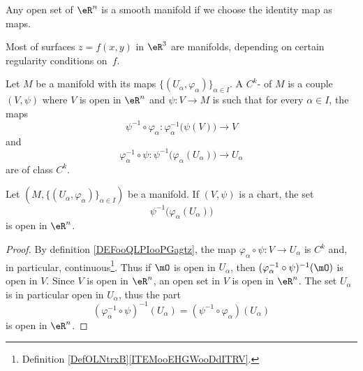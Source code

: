 \begin{example}
    Any open set of $\eR^n$ is a smooth manifold if we choose the identity map as maps.
\end{example} 

Most of surfaces $z=f(x,y)$ in $\eR^3$ are manifolds, depending on certain regularity conditions on~$f$.

\begin{definition}       \label{DEFooQLPIooPGagtz}
    Let \( M\) be a manifold with its maps \(  \{ (U_{\alpha}, \varphi_{\alpha}) \}_{\alpha\in I}   \). A \( C^k\)- of \( M\) is a couple \( (V,\psi)\) where \( V\) is open in \( \eR^n\) and \( \psi\colon V\to M\) is such that for every \( \alpha\in I\), the maps
    \begin{equation}
        \psi^{-1}\circ \varphi_{\alpha}\colon \varphi_{\alpha}^{-1}\big( \psi(V) \big)\to V
    \end{equation}
    and
    \begin{equation}
        \varphi_{\alpha}^{-1}\circ \psi\colon \psi^{-1}\big( \varphi_{\alpha}(U_{\alpha}) \big)\to U_{\alpha}
    \end{equation}
    are of class \( C^k\).
\end{definition}

\begin{lemma}       \label{LEMooGAMVooIWUzmy}
    Let \( (M,\{ (U_{\alpha}, \varphi_{\alpha}) \}_{\alpha\in I}) \) be a manifold. If \( (V,\psi)\) is a chart, the set
    \begin{equation}
        \psi^{-1}\big(\varphi_{\alpha}(U_{\alpha})\big)
    \end{equation}
    is open in \(\eR^n\).
\end{lemma}

\begin{proof}
    By definition \ref{DEFooQLPIooPGagtz}, the map \( \varphi_{\alpha}\circ \psi \colon V\to U_{\alpha}\) is \( C^k\) and, in particular, continuous\footnote{Definition \ref{DefOLNtrxB}\ref{ITEMooEHGWooDdITRV}.}. Thus if \( \mO\) is open in \( U_{\alpha}\), then \( (\varphi_{\alpha}^{-1}\circ\psi)^{-1}(\mO)\) is open in \( V\). Since \( V\) is open in \( \eR^n\), an open set in \( V\) is open in \( \eR^n\). The set \( U_{\alpha}\) is in particular open in \( U_{\alpha}\), thus the part
    \begin{equation}
        (\varphi_{\alpha}^{-1}\circ \psi)^{-1}(U_{\alpha})=(\psi^{-1}\circ\varphi_{\alpha})(U_{\alpha})
    \end{equation}
    is open in \( \eR^n\).
\end{proof}

